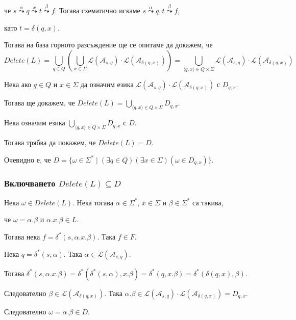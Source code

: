 \documentclass[12pt]{article}
\begin{document}
че \(s \overset{\alpha}{\leadsto} q \overset{x}{\leadsto} t \overset{\beta}{\leadsto} f\). Тогава схематично искаме \(s \overset{\alpha}{\leadsto} q, t \overset{\beta}{\leadsto} f\),

като \(t = \delta(q, x)\).

Тогава на база горното разсъждение ще се опитаме да докажем, че
\[Delete(L) = \displaystyle\bigcup_{q \in Q} \left( \displaystyle\bigcup_{x \in \Sigma}  \mathcal{L}(\mathcal{A}_{s, q}) \cdot \mathcal{L}(\mathcal{A}_{\delta(q, x)})\right) = \displaystyle\bigcup_{\langle q, x \rangle \in Q \times \Sigma} \mathcal{L}(\mathcal{A}_{s, q}) \cdot \mathcal{L}(\mathcal{A}_{\delta(q, x)})\]

Нека ако \(q \in Q\) и \(x \in \Sigma\) да означим езика \(\mathcal{L}(\mathcal{A}_{s, q}) \cdot \mathcal{L}(\mathcal{A}_{\delta(q, x)})\) с \(D_{q, x}\).

Тогава ще докажем, че \(Delete(L) = \displaystyle\bigcup_{\langle q, x \rangle \in Q \times \Sigma} D_{q, x}\).

Нека означим езика \(\displaystyle\bigcup_{\langle q, x \rangle \in Q \times \Sigma} D_{q, x}\) с \(D\).

Тогава трябва да покажем, че \(Delete(L) = D\).

Очевидно е, че \(D = \{\omega \in \Sigma^* \mid (\exists q \in Q)(\exists x \in \Sigma)(\omega \in D_{q, x})\}\).


\subsubsection*{Включването \(Delete(L) \subseteq D\)}
Нека \(\omega \in Delete(L)\). Нека тогава \(\alpha \in \Sigma^*\), \(x \in \Sigma\) и \(\beta \in \Sigma^*\)
са такива,

че \(\omega = \alpha.\beta\) и \(\alpha.x.\beta \in L\).

Тогава нека \(f = \delta^*(s, \alpha.x.\beta)\). Така \(f \in F\).

Нека \(q = \delta^*(s, \alpha)\). Така \(\alpha \in \mathcal{L}(\mathcal{A}_{s, q})\).

Тогава \(\delta^*(s, \alpha.x.\beta) = \delta^*(\delta^*(s, \alpha), x.\beta) = \delta^*(q, x.\beta) = \delta^*(\delta(q, x), \beta )\).

Следователно \(\beta \in \mathcal{L}(\mathcal{A}_{\delta(q, x)})\). Така \(\alpha.\beta \in \mathcal{L}(\mathcal{A}_{s, q}) \cdot \mathcal{L}(\mathcal{A}_{\delta(q, x)}) = D_{q, x}\).

Следователно \(\omega = \alpha.\beta \in D\).
\end{document}
